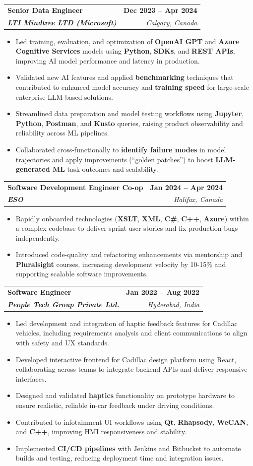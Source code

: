 \documentclass[letterpaper,11pt]{article}
\makeatletter
\newcommand{\resumeItem}[1]{
  \item\small{
    {#1 \vspace{-2pt}}
  }
}
\newcommand{\resumeSubheading}[4]{
  \vspace{-2pt}\item
    \begin{tabular*}{1.0\textwidth}[t]{l@{\extracolsep{\fill}}r}
      \textbf{#1} & \textbf{\small #2} \\
      \textit{\small#3} & \textit{\small #4} \\
    \end{tabular*}\vspace{-7pt}
}
\newcommand{\resumeItemListStart}{\begin{itemize}}
\newcommand{\resumeItemListEnd}{\end{itemize}\vspace{-5pt}}
\makeatother
\begin{document}
    \resumeSubheading
      {\textbf{Senior Data Engineer}}{\textbf{Dec 2023 -- Apr 2024}}
      {\textbf{LTI Mindtree LTD (Microsoft)}}{Calgary, Canada}
      \resumeItemListStart
        \resumeItem{Led training, evaluation, and optimization of \textbf{OpenAI GPT} and \textbf{Azure Cognitive Services} models using \textbf{Python}, \textbf{SDKs}, and \textbf{REST APIs}, improving AI model performance and latency in production.}
        \resumeItem{Validated new AI features and applied \textbf{benchmarking} techniques that contributed to enhanced model accuracy and \textbf{training speed} for large-scale enterprise LLM-based solutions.}
        \resumeItem{Streamlined data preparation and model testing workflows using \textbf{Jupyter}, \textbf{Python}, \textbf{Postman}, and \textbf{Kusto} queries, raising product observability and reliability across ML pipelines.}
        \resumeItem{Collaborated cross-functionally to \textbf{identify failure modes} in model trajectories and apply improvements (“golden patches”) to boost \textbf{LLM-generated ML} task outcomes and scalability.}
      \resumeItemListEnd
    
    \resumeSubheading
      {\textbf{Software Development Engineer Co-op}}{\textbf{Jan 2024 -- Apr 2024}}
      {\textbf{ESO}}{Halifax, Canada}
      \resumeItemListStart
        \resumeItem{Rapidly onboarded technologies (\textbf{XSLT}, \textbf{XML}, \textbf{C\#}, \textbf{C++}, \textbf{Azure}) within a complex codebase to deliver sprint user stories and fix production bugs independently.}
        \resumeItem{Introduced code-quality and refactoring enhancements via mentorship and \textbf{Pluralsight} courses, increasing development velocity by 10-15\% and supporting scalable software improvements.}
      \resumeItemListEnd

    \resumeSubheading
      {\textbf{Software Engineer}}{\textbf{Jan 2022 -- Aug 2022}}
      {\textbf{People Tech Group Private Ltd.}}{Hyderabad, India}
      \resumeItemListStart
        \resumeItem{Led development and integration of haptic feedback features for Cadillac vehicles, including requirements analysis and client communications to align with safety and UX standards.}
        \resumeItem{Developed interactive frontend for Cadillac design platform using React, collaborating across teams to integrate backend APIs and deliver responsive interfaces.}
        \resumeItem{Designed and validated \textbf{haptics} functionality on prototype hardware to ensure realistic, reliable in-car feedback under driving conditions.}
        \resumeItem{Contributed to infotainment UI workflows using \textbf{Qt}, \textbf{Rhapsody}, \textbf{WeCAN}, and \textbf{C++}, improving HMI responsiveness and stability.}
        \resumeItem{Implemented \textbf{CI/CD pipelines} with Jenkins and Bitbucket to automate builds and testing, reducing deployment time and integration issues.}
      \resumeItemListEnd
\end{document}
